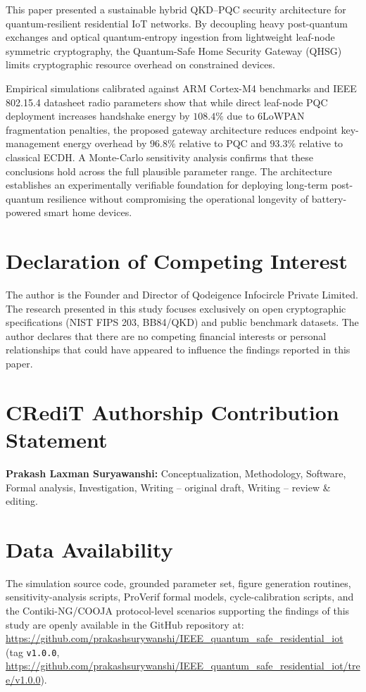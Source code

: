 \documentclass[journal]{IEEEtran}
\begin{document}
This paper presented a sustainable hybrid QKD--PQC security architecture for quantum-resilient
residential IoT networks. By decoupling heavy post-quantum exchanges and optical quantum-entropy
ingestion from lightweight leaf-node symmetric cryptography, the Quantum-Safe Home Security
Gateway (QHSG) limits cryptographic resource overhead on constrained devices.

Empirical simulations calibrated against ARM Cortex-M4 benchmarks and IEEE 802.15.4
datasheet radio parameters show that while direct leaf-node PQC deployment increases
handshake energy by $108.4\%$ due to 6LoWPAN fragmentation penalties, the proposed gateway
architecture reduces endpoint key-management energy overhead by $96.8\%$ relative to PQC
and $93.3\%$ relative to classical ECDH. A Monte-Carlo sensitivity analysis confirms that
these conclusions hold across the full plausible parameter range. The architecture
establishes an experimentally verifiable foundation for deploying long-term post-quantum
resilience without compromising the operational longevity of battery-powered smart home
devices.


\section*{Declaration of Competing Interest}
The author is the Founder and Director of Qodeigence Infocircle Private Limited.
The research presented in this study focuses exclusively on open cryptographic
specifications (NIST FIPS 203, BB84/QKD) and public benchmark datasets. The author
declares that there are no competing financial interests or personal relationships
that could have appeared to influence the findings reported in this paper.

\section*{CRediT Authorship Contribution Statement}
\textbf{Prakash Laxman Suryawanshi:} Conceptualization, Methodology, Software, Formal analysis,
Investigation, Writing -- original draft, Writing -- review \& editing.

\section*{Data Availability}
The simulation source code, grounded parameter set, figure generation routines,
sensitivity-analysis scripts, ProVerif formal models, cycle-calibration scripts, and the
Contiki-NG/COOJA protocol-level scenarios supporting the findings of this study are openly
available in the GitHub repository at:
\url{https://github.com/prakashsurywanshi/IEEE_quantum_safe_residential_iot}
(tag \texttt{v1.0.0},
\url{https://github.com/prakashsurywanshi/IEEE_quantum_safe_residential_iot/tree/v1.0.0}).
\end{document}
